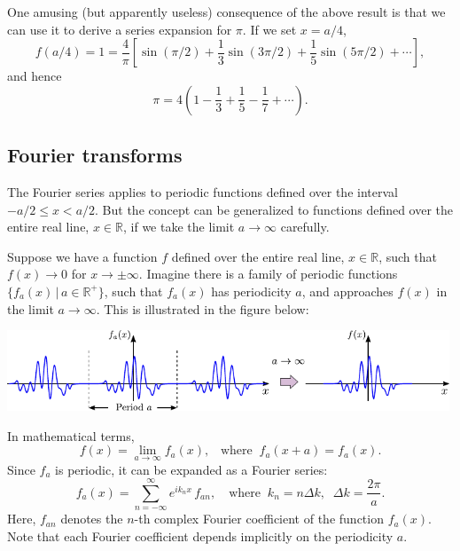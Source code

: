 \documentclass[10pt,a4paper]{article}
\begin{document}
One amusing (but apparently useless) consequence of the above result is
that we can use it to derive a series expansion for $\pi$. If we set
$x = a/4$,
\begin{equation}
f(a/4) = 1 = \frac{4}{\pi} \left[\sin(\pi/2) + \frac{1}{3}\sin(3\pi/2) + \frac{1}{5}\sin(5\pi/2) + \cdots\right],
\end{equation}
and hence
\begin{equation}
\pi = 4 \left(1 - \frac{1}{3} + \frac{1}{5} - \frac{1}{7} + \cdots\right).
\end{equation}

\subsection{Fourier transforms}
\label{fourier-transforms}

The Fourier series applies to periodic functions defined over the
interval $-a/2 \le x < a/2$.  But the concept can be generalized to
functions defined over the entire real line, $x \in \mathbb{R}$, if we
take the limit $a \rightarrow \infty$ carefully.

Suppose we have a function $f$ defined over the entire real line, $x
\in \mathbb{R}$, such that $f(x) \rightarrow 0$ for $x \rightarrow
\pm\infty$. Imagine there is a family of periodic functions
$\big\{f_a(x) \,\big|\, a \in\mathbb{R}^+\big\}$, such that $f_a(x)$
has periodicity $a$, and approaches $f(x)$ in the limit $a\rightarrow
\infty$. This is illustrated in the figure below:

\begin{center}
  \includegraphics[width=0.99\textwidth]{periodicity_ft}
\end{center}

In mathematical terms,
\begin{equation}
f(x) = \lim_{a \rightarrow \infty} f_a(x), \;\;\;\text{where}\;\; f_a(x+a) = f_a(x).
\end{equation}
Since $f_a$ is periodic, it can be expanded as a Fourier series:
\begin{equation}
f_a(x) = \sum_{n=-\infty}^\infty e^{i k_n x}\, f_{an}, \quad\mathrm{where}\;\; k_n = n\Delta k, \;\; \Delta k = \frac{2\pi}{a}.
\end{equation}
Here, $f_{an}$ denotes the $n$-th complex Fourier coefficient of the
function $f_a(x)$. Note that each Fourier coefficient depends
implicitly on the periodicity $a$.
\end{document}
